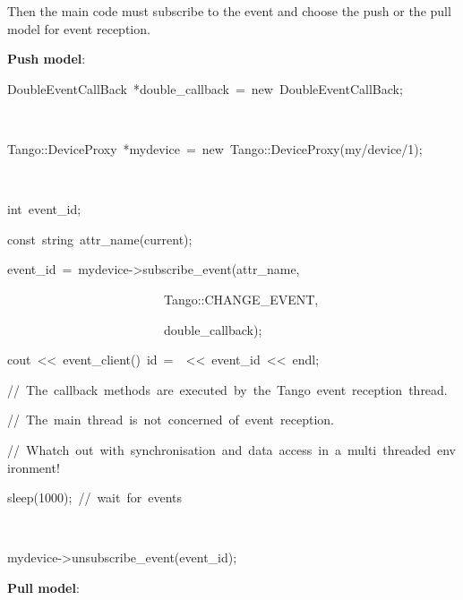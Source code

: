 Then the main code must subscribe to the event
and choose the push or the pull model for event reception.

\textbf{Push model}:


\begin{lyxcode}
DoubleEventCallBack~{*}double\_callback~=~new~DoubleEventCallBack;~

~~~~~~

Tango::DeviceProxy~{*}mydevice~=~new~Tango::DeviceProxy(\textquotedbl{}my/device/1\textquotedbl{});

~

int~event\_id;

const~string~attr\_name(\textquotedbl{}current\textquotedbl{});

event\_id~=~mydevice->subscribe\_event(attr\_name,~

~~~~~~~~~~~~~~~~~~~~~~~~~Tango::CHANGE\_EVENT,

~~~~~~~~~~~~~~~~~~~~~~~~~double\_callback);

cout~<\textcompwordmark{}<~\textquotedbl{}event\_client()~id~=~\textquotedbl{}~<\textcompwordmark{}<~event\_id~<\textcompwordmark{}<~endl;



//~The~callback~methods~are~executed~by~the~Tango~event~reception~thread.

//~The~main~thread~is~not~concerned~of~event~reception.

//~Whatch~out~with~synchronisation~and~data~access~in~a~multi~threaded~environment!



sleep(1000);~//~wait~for~events

~

mydevice->unsubscribe\_event(event\_id);
\end{lyxcode}


\textbf{Pull model}:

